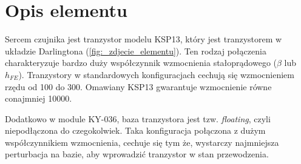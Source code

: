 \documentclass[11pt, a4paper]{article}
\author{Patryk Kościk}
\begin{document}
%
%
\newpage

\section*{Opis elementu}
Sercem czujnika jest tranzystor modelu KSP13, który jest tranzystorem w układzie Darlingtona (\ref{fig:_zdjecie_elementu}). Ten rodzaj połączenia charakteryzuje bardzo duży współczynnik wzmocnienia stałoprądowego ($\beta$ lub $h_{FE}$). Tranzystory w standardowych konfiguracjach cechują się wzmocnieniem rzędu od 100 do 300. Omawiany KSP13 gwarantuje wzmocnienie równe conajmniej 10000.

Dodatkowo w module KY-036, baza tranzystora jest tzw. \textit{floating}, czyli niepodłączona do czegokolwiek. Taka konfiguracja połączona z dużym współczynnikiem wzmocnienia, cechuje się tym że, wystarczy najmniejsza perturbacja na bazie, aby wprowadzić tranzystor w stan przewodzenia.
\end{document}
